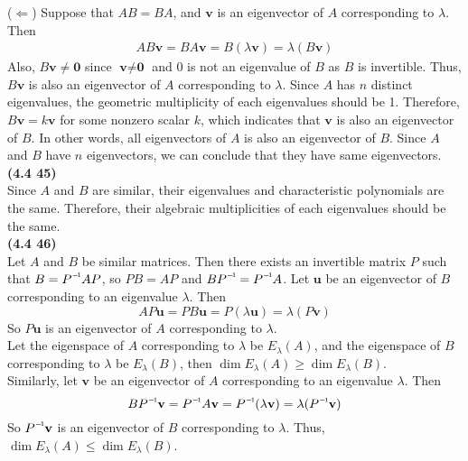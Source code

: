 ($\Leftarrow$) Suppose that $AB = BA$, and $\textbf{v}$ is an eigenvector of $A$ corresponding to $\lambda$. Then \begin{align*}
	AB\textbf{v} = BA\textbf{v} = B(\lambda\textbf{v}) = \lambda(B\textbf{v})
\end{align*} Also, $B\textbf{v} \neq \textbf{0}$ since $\textbf{v} \neq \textbf{0}$ and 0 is not an eigenvalue of $B$ as $B$ is invertible. Thus, $B\textbf{v}$ is also an eigenvector of $A$ corresponding to $\lambda$. Since $A$ has $n$ distinct eigenvalues, the geometric multiplicity of each eigenvalues should be 1. Therefore, $B\textbf{v} = k\textbf{v}$ for some nonzero scalar $k$, which indicates that $\textbf{v}$ is also an eigenvector of $B$. In other words, all eigenvectors of $ A $ is also an eigenvector of $ B $. Since $ A $ and $ B $ have $ n $ eigenvectors, we can conclude that they have same eigenvectors. \\

\textbf{(4.4 45)} \\
Since $A$ and $B$ are similar, their eigenvalues and characteristic polynomials are the same. Therefore, their algebraic multiplicities of each eigenvalues should be the same. \\

\textbf{(4.4 46)} \\
Let $A$ and $B$ be similar matrices. Then there exists an invertible matrix $P$ such that $B = \inv{P}AP$, so $PB = AP$ and $B\inv{P} = \inv{P}A$. Let $\textbf{u}$ be an eigenvector of $B$ corresponding to an eigenvalue $\lambda$. Then \begin{equation*}
	AP\textbf{u} = PB\textbf{u} = P(\lambda\textbf{u}) = \lambda(P\textbf{v})
\end{equation*} So $P\textbf{u}$ is an eigenvector of $A$ corresponding to $\lambda$. \\
Let the eigenspace of $A$ corresponding to $\lambda$ be $E_\lambda(A)$, and the eigenspace of $B$ corresponding to $\lambda$ be $E_\lambda(B)$, then $\dim{E_{\lambda}(A)} \ge \dim{E_{\lambda}(B)}$. \\

Similarly, let $\textbf{v}$ be an eigenvector of $A$ corresponding to an eigenvalue $\lambda$. Then \begin{equation*}
	B\inv{P}\textbf{v} = \inv{P}A\textbf{v} = \inv{P}(\lambda\textbf{v}) = \lambda(\inv{P}\textbf{v})
\end{equation*} So $\inv{P}\textbf{v}$ is an eigenvector of $B$ corresponding to $\lambda$. Thus, $\dim{E_{\lambda}(A)} \le \dim{E_{\lambda}(B)}$. \\

